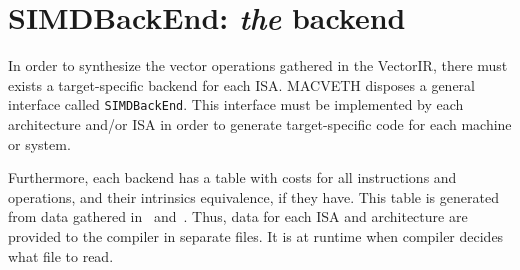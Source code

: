 \section{SIMDBackEnd: \textit{the} backend}
In order to synthesize the vector operations gathered in the VectorIR, there
must exists a target-specific backend for each ISA. MACVETH disposes a general
interface called \texttt{SIMDBackEnd}. This interface must be
implemented by each architecture and/or ISA in order to generate
target-specific code for each machine or system.

Furthermore, each backend has a table with costs for all instructions and 
operations, and their intrinsics equivalence, if they have. This table is 
generated from data gathered in~\cite{bib:uops} and~\cite{bib:intrinsics}. 
Thus, data for each ISA and architecture are provided to the compiler in 
separate files. It is at runtime when compiler decides what file to read.


